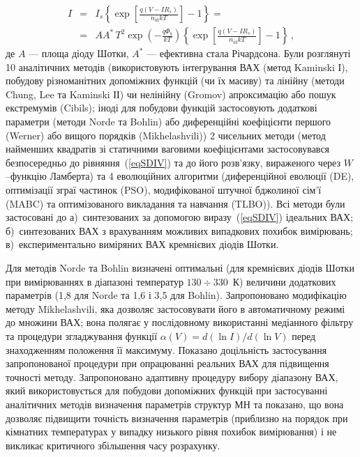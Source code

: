 \documentclass[a5paper,10pt,twoside,openany,article]{memoir} %
\begin{document}
\begin{eqnarray}
\label{eqSDIV}
\nonumber I&=&I_s\left\{\exp\left[\frac{q(V-IR_s)}{n_\mathrm{id}kT}\right]-1\right\}=\\
&=&AA^*\,T^2\exp\left(-\frac{q\Phi_b}{kT}\right)\left\{\exp\left[\frac{q(V-IR_s)}{n_\mathrm{id}kT}\right]-1\right\}\,,
\end{eqnarray}
де
$A$ --- площа діоду Шотки,
$A^*$ --- ефективна стала Річардсона.
Були розглянуті 10 аналітичних методів (використовують інтегрування ВАХ (метод Kaminski І), побудову різноманітних допоміжних функцій (чи їх масиву) та лінійну (методи Chung, Lee та Kaminski ІІ) чи нелінійну (Gromov) апроксимацію або пошук екстремумів (Cibils);
іноді для побудови функцій застосовують додаткові параметри (методи Norde та Bohlin) або диференційні коефіцієнти першого (Werner) або вищого порядків (Mikhelashvili))
2 чисельних методи (метод найменших квадратів зі статичними ваговими коефіцієнтами застосовувався безпосередньо до рівняння~(\ref{eqSDIV}) та до його розв'язку, вираженого через $W$--функцію Ламберта) та
4 еволюційних алгоритми (диференційної еволюції (DE),
оптимізації зграї частинок (PSO),
модифікованої штучної бджолиної сім'ї (MABC) та
оптимізованого викладання та навчання (TLBO)).
Всі методи були застосовані до 
а)~синтезованих за допомогою виразу~(\ref{eqSDIV}) ідеальних ВАХ;
б)~синтезованих ВАХ з врахуванням можливих випадкових похибок вимірювань;
в)~експериментально виміряних ВАХ кремнієвих діодів Шотки. 

Для методів Norde та Bohlin визначені  оптимальні (для кремнієвих діодів Шотки при вимірюваннях в діапазоні температур $130\div330$~К) величини додаткових параметрів (1,8 для Norde та 1,6 і 3,5 для Bohlin).
Запропоновано модифікацію методу Mikhelashvili, яка дозволяє застосовувати його в автоматичному режимі до множини ВАХ;
вона полягає у послідовному використанні медіанного фільтру та процедури згладжування функції $\alpha(V)=d(\ln I)/d(\ln V)$ перед знаходженням положення її максимуму.
Показано доцільність застосування запропонованої процедури при опрацюванні реальних ВАХ для підвищення точності методу.
Запропоновано адаптивну процедуру вибору діапазону ВАХ, який використовується для побудови допоміжних функцій при застосуванні аналітичних методів визначення параметрів структур МН та показано, що вона дозволяє підвищити точність визначення параметрів (приблизно на порядок при кімнатних температурах у випадку низького рівня похибок вимірювання) і не викликає критичного збільшення часу розрахунку.
\end{document}
